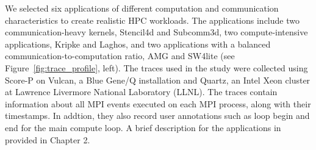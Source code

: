 We selected six applications of different computation and communication
characteristics to create realistic HPC workloads. The applications include two
communication-heavy kernels, Stencil4d\cite{bhatele2018evaluating} and Subcomm3d\cite{bhatele2018evaluating}, two compute-intensive
applications, Kripke\cite{kripke} and Laghos\cite{laghos}, and two applications with a balanced
communication-to-computation ratio, AMG\cite{amg} and SW4lite\cite{sjogreen2018sw4} (see
Figure~\ref{fig:trace_profile}, left).  The traces used in the study were
collected using Score-P \cite{knupfer2012score} on Vulcan, a Blue Gene/Q
installation and Quartz, an Intel Xeon cluster at Lawrence Livermore National
Laboratory (LLNL). The traces contain information about all MPI events executed on each MPI process, along with their
timestamps. In addtion, they also record user annotations such as loop
begin and end for the main compute loop. A brief description for the applications in provided in Chapter 2. 

